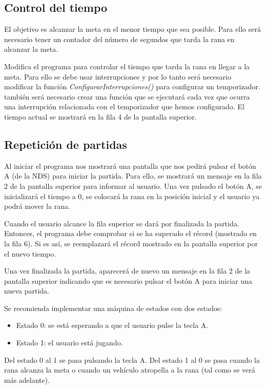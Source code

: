 \subsection{Control del tiempo}
El objetivo es alcanzar la meta en el menor tiempo que sea posible. Para ello será necesario tener un contador del número de segundos que tarda la rana en alcanzar la meta.

\begin{exercise}
	Modifica el programa para controlar el tiempo que tarda la rana en llegar a la meta. Para ello se debe usar interrupciones y por lo tanto será necesario modificar la función \textit{ConfigurarInterrupciones()} para configurar un temporizador. también será necesario crear una función que se ejecutará cada vez que ocurra una interrupción relacionada con el temporizador que hemos configurado. El tiempo actual se mostrará en la fila 4 de la pantalla superior.
\end{exercise}
	
	
\subsection{Repetición de partidas}
Al iniciar el programa nos mostrará una pantalla que nos pedirá pulsar el botón A (de la NDS) para iniciar la partida. Para ello, se mostrará un mensaje en la fila 2 de la pantalla superior para informar al usuario. Una vez pulsado el botón A, se inicializará el tiempo a 0, se colocará la rana en la posición inicial y el usuario ya podrá mover la rana. 

Cuando el usuario alcance la fila superior se dará por finalizada la partida. Entonces, el programa debe comprobar si se ha superado el récord (mostrado en la fila 6). Si es así, se reemplazará el récord mostrado en la pantalla superior por el nuevo tiempo. 

Una vez finalizada la partida, aparecerá de nuevo un mensaje en la fila 2 de la pantalla superior indicando que es necesario pulsar el botón A para iniciar una nueva partida. 

Se recomienda implementar una máquina de estados con dos estados:
\begin{itemize}
	\item Estado 0: se está esperando a que el usuario pulse la tecla A.
	\item Estado 1: el usuario está jugando.
\end{itemize}
Del estado 0 al 1 se pasa pulsando la tecla A. Del estado 1 al 0 se pasa cuando la rana alcanza la meta o cuando un vehículo atropella a la rana (tal como se verá más adelante).

